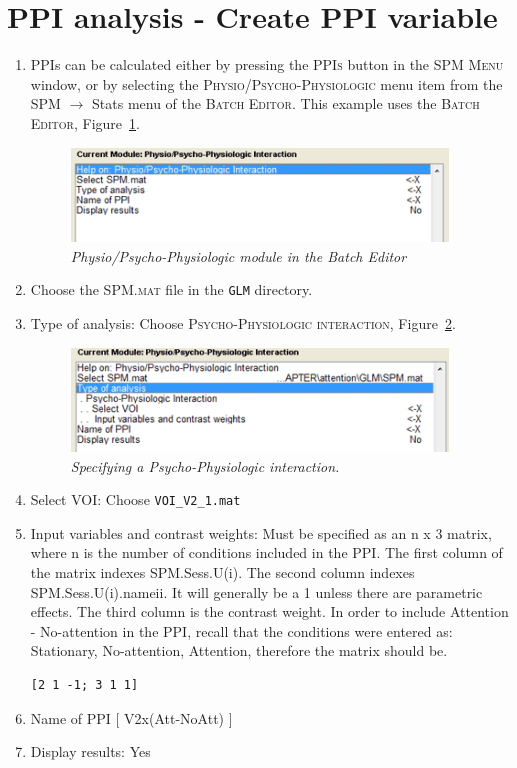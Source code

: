 \section{PPI analysis - Create PPI variable\label{create_ppi}}
\begin{enumerate}
\item PPIs can be calculated either by pressing the \textsc{PPIs} button in the \textsc{SPM Menu} window, or by selecting the \textsc{Physio/Psycho-Physiologic} menu item from the SPM $\rightarrow$ Stats menu of the \textsc{Batch Editor}. This example uses the \textsc{Batch Editor}, Figure~\ref{fig:ppi11}.

\begin{figure}[!ht]
\centering\includegraphics[width=100mm]{ppi/figures/Fig11.png}
\caption{\em Physio/Psycho-Physiologic module in the Batch Editor}
\label{fig:ppi11}
\end{figure}

\item Choose the \textsc{SPM.mat} file in the \texttt{GLM} directory.
\item Type of analysis: Choose \textsc{Psycho-Physiologic interaction}, Figure~\ref{fig:ppi12}.

\begin{figure}[!ht]
\centering\includegraphics[width=100mm]{ppi/figures/Fig12.png}
\caption{\em Specifying a Psycho-Physiologic interaction.}
\label{fig:ppi12}
\end{figure}

\item Select VOI: Choose \texttt{VOI\_V2\_1.mat}
\item Input variables and contrast weights: Must be specified as an n x 3 matrix, where n is the number of conditions included in the PPI. The first column of the matrix indexes SPM.Sess.U(i). The second column indexes SPM.Sess.U(i).name{ii}. It will generally be a 1 unless there are parametric effects. The third column is the contrast weight. In order to include Attention - No-attention in the PPI, recall that the conditions were entered as: Stationary, No-attention, Attention, therefore the matrix should be.
\begin{verbatim}
[2 1 -1; 3 1 1]
\end{verbatim}
\item Name of PPI [ V2x(Att-NoAtt) ]
\item Display results: Yes
\end{enumerate}

